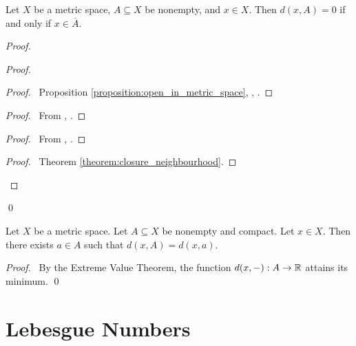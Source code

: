 \begin{theorem}
    Let $X$ be a metric space, $A \subseteq X$ be nonempty, and $x \in X$.
    Then $d(x, A) = 0$ if and only if $x \in \overline{A}$.
\end{theorem}

\begin{proof}
    \pf
    \begin{proof}
        \begin{proof}
            \pf\ Proposition \ref{proposition:open_in_metric_space}, ,
            .
        \end{proof}
        \begin{proof}
            \pf\ From , .
        \end{proof}
        \begin{proof}
            \pf\ From , .
        \end{proof}
        \qedstep
        \begin{proof}
            \pf\ Theorem \ref{theorem:closure_neighbourhood}.
        \end{proof}
    \end{proof}
    \qed
\end{proof}

\begin{theorem}
    Let $X$ be a metric space. Let $A \subseteq X$ be nonempty and compact.
    Let $x \in X$. Then there exists $a \in A$ such that $d(x,A) = d(x,a)$.
\end{theorem}

\begin{proof}
    \pf\ By the Extreme Value Theorem, the function $d(x,-) : A \rightarrow \mathbb{R}$ attains its minimum. \qed
\end{proof}

\section{Lebesgue Numbers}

